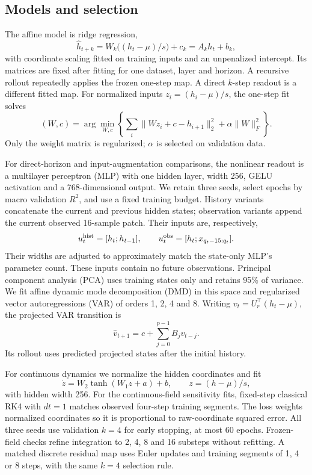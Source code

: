 \documentclass[10pt,a4paper,twocolumn]{article}
\begin{document}
\subsection{Models and selection}
The affine model is ridge regression,
\begin{equation}
 \widehat h_{t+k}=W_k\bigl((h_t-\mu)/s\bigr)+c_k
                =A_kh_t+b_k ,
\end{equation}
with coordinate scaling fitted on training inputs and an unpenalized intercept.
Its matrices are fixed after fitting for one dataset, layer and horizon.
A recursive rollout repeatedly applies the frozen one-step map.
A direct $k$-step readout is a different fitted map.
For normalized inputs $z_i=(h_i-\mu)/s$, the one-step fit solves
\begin{equation}
 (W,c)=\arg\min_{W,c}\left\{
 \sum_i\|Wz_i+c-h_{i+1}\|_2^2+\alpha\|W\|_F^2\right\}.
\end{equation}
Only the weight matrix is regularized; $\alpha$ is selected on validation data.

For direct-horizon and input-augmentation comparisons, the nonlinear readout is a multilayer perceptron (MLP) with one hidden layer, width 256, GELU activation and a 768-dimensional output.
We retain three seeds, select epochs by macro validation $R^2$, and use a fixed training budget.
History variants concatenate the current and previous hidden states; observation variants append the current observed 16-sample patch.
Their inputs are, respectively,
\begin{equation}
 u_t^{\rm hist}=[h_t;h_{t-1}],\qquad
 u_t^{\rm obs}=[h_t;x_{q_t-15:q_t}].
\end{equation}
Their widths are adjusted to approximately match the state-only MLP's parameter count.
These inputs contain no future observations.
Principal component analysis (PCA) uses training states only and retains 95\% of variance.
We fit affine dynamic mode decomposition (DMD) in this space and regularized vector autoregressions (VAR) of orders 1, 2, 4 and 8.
Writing $v_t=U_r^\top(h_t-\mu)$, the projected VAR transition is
\begin{equation}
 \widehat v_{t+1}=c+\sum_{j=0}^{p-1}B_jv_{t-j}.
\end{equation}
Its rollout uses predicted projected states after the initial history.

For continuous dynamics we normalize the hidden coordinates and fit
\begin{equation}
 \dot z=W_2\tanh(W_1z+a)+b,\qquad
 z=(h-\mu)/s ,
\end{equation}
with hidden width 256.
For the continuous-field sensitivity fits, fixed-step classical RK4 with $dt=1$ matches observed four-step training segments.
The loss weights normalized coordinates so it is proportional to raw-coordinate squared error.
All three seeds use validation $k=4$ for early stopping, at most 60 epochs.
Frozen-field checks refine integration to 2, 4, 8 and 16 substeps without refitting.
A matched discrete residual map uses Euler updates and training segments of 1, 4 or 8 steps, with the same $k=4$ selection rule.
\end{document}
